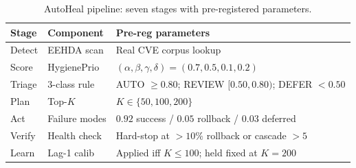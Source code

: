 \begin{table}[!t]
 \caption{AutoHeal pipeline: seven stages with pre-registered parameters.}
 \label{tab:architecture}
 \centering
 \small
 \setlength{\tabcolsep}{4pt}
 \begin{tabular}{@{}p{1.5cm}p{2.0cm}p{4.0cm}@{}}
 \toprule
 \textbf{Stage} & \textbf{Component} & \textbf{Pre-reg parameters} \\
 \midrule
 Detect & EEHDA scan & Real CVE corpus lookup \\
 Score & HygienePrio & $(\alpha,\beta,\gamma,\delta)=(0.7,0.5,0.1,0.2)$ \\
 Triage & 3-class rule & AUTO $\geq 0.80$; REVIEW $[0.50,0.80)$; DEFER $< 0.50$ \\
 Plan & Top-$K$ & $K \in \{50,100,200\}$ \\
 Act & Failure modes & $0.92$ success / $0.05$ rollback / $0.03$ deferred \\
 Verify & Health check & Hard-stop at $>10\%$ rollback or cascade $> 5$ \\
 Learn & Lag-1 calib & Applied iff $K \leq 100$; held fixed at $K=200$ \\
 \bottomrule
 \end{tabular}
\end{table}
